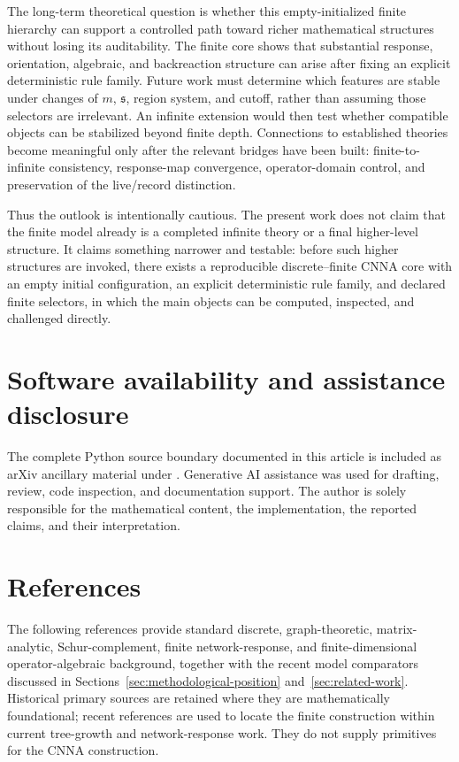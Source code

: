 \documentclass[11pt]{article}
\theoremstyle{remark}
\newcommand{\src}[1]{{\scriptsize\path{#1}}}
\numberwithin{equation}{section}
\begin{document}
The long-term theoretical question is whether this empty-initialized finite hierarchy can support a controlled path toward richer mathematical structures without losing its auditability. The finite core shows that substantial response, orientation, algebraic, and backreaction structure can arise after fixing an explicit deterministic rule family. Future work must determine which features are stable under changes of \(m\), \(\mathfrak{s}\), region system, and cutoff, rather than assuming those selectors are irrelevant. An infinite extension would then test whether compatible objects can be stabilized beyond finite depth. Connections to established theories become meaningful only after the relevant bridges have been built: finite-to-infinite consistency, response-map convergence, operator-domain control, and preservation of the live/record distinction.

Thus the outlook is intentionally cautious. The present work does not claim that the finite model already is a completed infinite theory or a final higher-level structure. It claims something narrower and testable: before such higher structures are invoked, there exists a reproducible discrete--finite CNNA core with an empty initial configuration, an explicit deterministic rule family, and declared finite selectors, in which the main objects can be computed, inspected, and challenged directly.


\section*{Software availability and assistance disclosure}
The complete Python source boundary documented in this article is included as arXiv ancillary material under \src{anc/CNNA_structured_core_pkg}. Generative AI assistance was used for drafting, review, code inspection, and documentation support. The author is solely responsible for the mathematical content, the implementation, the reported claims, and their interpretation.

\section{References}
The following references provide standard discrete, graph-theoretic, matrix-analytic, Schur-complement, finite network-response, and finite-dimensional operator-algebraic background, together with the recent model comparators discussed in Sections~\ref{sec:methodological-position} and~\ref{sec:related-work}. Historical primary sources are retained where they are mathematically foundational; recent references are used to locate the finite construction within current tree-growth and network-response work. They do not supply primitives for the CNNA construction.
\end{document}
